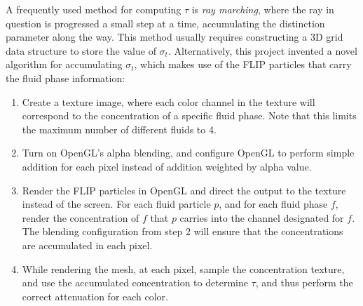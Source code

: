 A frequently used method for computing $\tau$ is \textit{ray marching}, where the ray in question is progressed a small step at a time, accumulating the distinction parameter along the way. This method usually requires constructing a 3D grid data structure to store the value of $\sigma_t$. Alternatively, this project invented a novel algorithm for accumulating $\sigma_t$, which makes use of the FLIP particles that carry the fluid phase information:
\begin{enumerate}
    \item 
    Create a texture image, where each color channel in the texture will correspond to the concentration of a specific fluid phase. Note that this limits the maximum number of different fluids to 4.
    \item 
    Turn on OpenGL's alpha blending, and configure OpenGL to perform simple addition for each pixel instead of addition weighted by alpha value.
    \item 
    Render the FLIP particles in OpenGL and direct the output to the texture instead of the screen. For each fluid particle $p$, and for each fluid phase $f$, render the concentration of $f$ that $p$ carries into the channel designated for $f$. The blending configuration from step 2 will ensure that the concentrations are accumulated in each pixel.
    \item 
    While rendering the mesh, at each pixel, sample the concentration texture, and use the accumulated concentration to determine $\tau$, and thus perform the correct attenuation for each color.
    
\end{enumerate}

